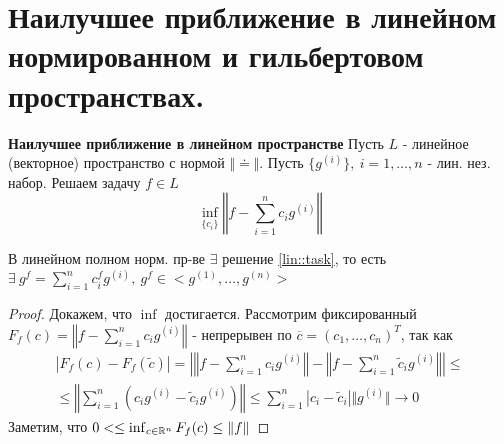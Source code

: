 \section{Наилучшее приближение в линейном нормированном и гильбертовом пространствах.}
\textbf{Наилучшее приближение в линейном пространстве}
Пусть $L$ - линейное (векторное) пространство с нормой $\Vert\doteq\Vert$.
Пусть $\{g^{(i)}\},\ i=1,\ldots,n$ - лин. нез. набор.
Решаем задачу $f\in L$
\begin{equation}\label{lin::task}
  \inf_{\{c_i\}}\left\Vert f-\sum_{i=1}^nc_ig^{(i)}\right\Vert
\end{equation}
\begin{theorem}
  В линейном полном норм. пр-ве $\exists$ решение \eqref{lin::task}, то есть $\exists\ g^f=\sum_{i=1}^nc_i^fg^{(i)},\ g^f\in<g^{(1)},\ldots,g^{(n)}>$
\end{theorem}
\begin{proof}
  Докажем, что $\inf$ достигается.
  Рассмотрим фиксированный $F_f(c)=\left\Vert f-\sum_{i=1}^nc_ig^{(i)}\right\Vert$ - непрерывен по $\overline{c}=(c_1,\ldots,c_n)^T$, так как
  \begin{multline*}
    \left|F_f(c)-F_f(\tilde{c})\right|=\left|\left\Vert f-\sum_{i=1}^nc_ig^{(i)}\right\Vert-\left\Vert f-\sum_{i=1}^n\tilde{c}_ig^{(i)}\right\Vert\right|\leq\\
    \leq \left\Vert \sum_{i=1}^n(c_ig^{(i)}-\tilde{c}_ig^{(i)})\right\Vert\leq\sum_{i=1}^n\left|c_i-\tilde{c}_i\right|\Vert g^{(i)}\Vert\rightarrow0
  \end{multline*}
  Заметим, что $0<\leq\inf_{c\in\mathbb{R}^n}F_f(c)\leq\Vert f\Vert$
\end{proof}

